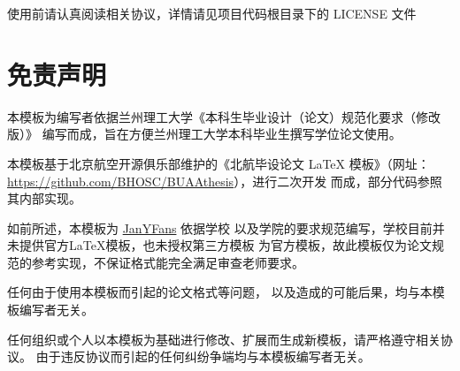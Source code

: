 	使用前请认真阅读相关协议，详情请见项目代码根目录下的 LICENSE 文件
	
\section{免责声明}

	本模板为编写者依据兰州理工大学《本科生毕业设计（论文）规范化要求（修改版）》
	编写而成，旨在方便兰州理工大学本科毕业生撰写学位论文使用。
	
	本模板基于北京航空开源俱乐部维护的《北航毕设论文 LaTeX
	模板》（网址：\url{https://github.com/BHOSC/BUAAthesis}），进行二次开发
	而成，部分代码参照其内部实现。
	
	如前所述，本模板为 \href{https://github.com/janyfans}{JanYFans} 依据学校
	以及学院的要求规范编写，学校目前并未提供官方\LaTeX{}模板，也未授权第三方模板
	为官方模板，故此模板仅为论文规范的参考实现，不保证格式能完全满足审查老师要求。
	
	任何由于使用本模板而引起的论文格式等问题，
	以及造成的可能后果，均与本模板编写者无关。
	
	任何组织或个人以本模板为基础进行修改、扩展而生成新模板，请严格遵守相关协议。
	由于违反协议而引起的任何纠纷争端均与本模板编写者无关。
